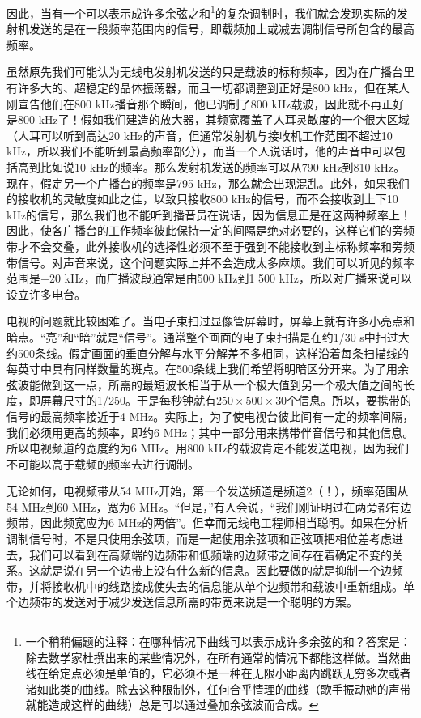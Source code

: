 因此，当有一个可以表示成许多余弦之和\footnote{一个稍稍偏题的注释：在哪种情况下曲线可以表示成许多余弦的和？答案是：除去数学家杜撰出来的某些情况外，在所有通常的情况下都能这样做。当然曲线在给定点必须是单值的，它必须不是一种在无限小距离内跳跃无穷多次或者诸如此类的曲线。除去这种限制外，任何合乎情理的曲线（歌手振动她的声带就能造成这样的曲线）总是可以通过叠加余弦波而合成。}的复杂调制时，我们就会发现实际的发射机发送的是在一段频率范围内的信号，即载频加上或减去调制信号所包含的最高频率。

虽然原先我们可能认为无线电发射机发送的只是载波的标称频率，因为在广播台里有许多大的、超稳定的晶体振荡器，而且一切都调整到正好是800 kHz，但在某人刚宣告他们在800 kHz播音那个瞬间，他已调制了800 kHz载波，因此就不再正好是800 kHz了！假如我们建造的放大器，其频宽覆盖了人耳灵敏度的一个很大区域（人耳可以听到高达20 kHz的声音，但通常发射机与接收机工作范围不超过10 kHz，所以我们不能听到最高频率部分），而当一个人说话时，他的声音中可以包括高到比如说10 kHz的频率。那么发射机发送的频率可以从790 kHz到810 kHz。现在，假定另一个广播台的频率是795 kHz，那么就会出现混乱。此外，如果我们的接收机的灵敏度如此之佳，以致只接收800 kHz的信号，而不会接收到上下10 kHz的信号，那么我们也不能听到播音员在说话，因为信息正是在这两种频率上！因此，使各广播台的工作频率彼此保持一定的间隔是绝对必要的，这样它们的旁频带才不会交叠，此外接收机的选择性必须不至于强到不能接收到主标称频率和旁频带信号。对声音来说，这个问题实际上并不会造成太多麻烦。我们可以听见的频率范围是$\pm$20 kHz，而广播波段通常是由500 kHz到1 500 kHz，所以对广播来说可以设立许多电台。

电视的问题就比较困难了。当电子束扫过显像管屏幕时，屏幕上就有许多小亮点和暗点。“亮”和“暗”就是“信号”。通常整个画面的电子束扫描是在约1/30 s中扫过大约500条线。假定画面的垂直分解与水平分解差不多相同，这样沿着每条扫描线的每英寸中具有同样数量的斑点。在500条线上我们希望将明暗区分开来。为了用余弦波能做到这一点，所需的最短波长相当于从一个极大值到另一个极大值之间的长度，即屏幕尺寸的1/250。于是每秒钟就有$250\times 500\times 30$个信息。所以，要携带的信号的最高频率接近于4 MHz。实际上，为了使电视台彼此间有一定的频率间隔，我们必须用更高的频率，即约6 MHz；其中一部分用来携带伴音信号和其他信息。所以电视频道的宽度约为6 MHz。用800 kHz的载波肯定不能发送电视，因为我们不可能以高于载频的频率去进行调制。

无论如何，电视频带从54 MHz开始，第一个发送频道是频道2（！），频率范围从54 MHz到60 MHz，宽为6 MHz。“但是，”有人会说，“我们刚证明过在两旁都有边频带，因此频宽应为6 MHz的两倍”。但幸而无线电工程师相当聪明。如果在分析调制信号时，不是只使用余弦项，而是一起使用余弦项和正弦项把相位差考虑进去，我们可以看到在高频端的边频带和低频端的边频带之间存在着确定不变的关系。这就是说在另一个边带上没有什么新的信息。因此要做的就是抑制一个边频带，并将接收机中的线路接成使失去的信息能从单个边频带和载波中重新组成。单个边频带的发送对于减少发送信息所需的带宽来说是一个聪明的方案。

